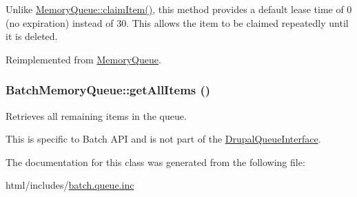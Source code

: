 Unlike \hyperlink{classMemoryQueue_a24cba156a854a7b4b6c81c3d2614508d}{MemoryQueue::claimItem()}, this method provides a default lease time of 0 (no expiration) instead of 30. This allows the item to be claimed repeatedly until it is deleted. 

Reimplemented from \hyperlink{classMemoryQueue_a24cba156a854a7b4b6c81c3d2614508d}{MemoryQueue}.\hypertarget{classBatchMemoryQueue_abad9192ab29e694e10d4a520cb43e6fa}{
\subsubsection[{getAllItems}]{\setlength{\rightskip}{0pt plus 5cm}BatchMemoryQueue::getAllItems ()}}
\label{classBatchMemoryQueue_abad9192ab29e694e10d4a520cb43e6fa}
Retrieves all remaining items in the queue.

This is specific to Batch API and is not part of the \hyperlink{interfaceDrupalQueueInterface}{DrupalQueueInterface}. 

The documentation for this class was generated from the following file:\begin{DoxyCompactItemize}
\item 
html/includes/\hyperlink{batch_8queue_8inc}{batch.queue.inc}\end{DoxyCompactItemize}
